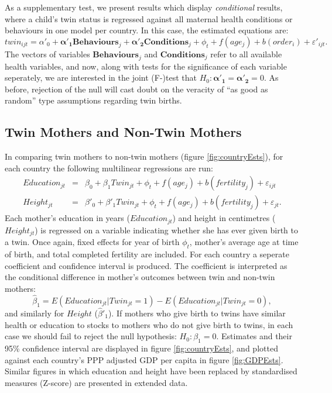 \documentclass{nature}
\begin{document}
\begin{linenumbers}



As a supplementary test, we present results which display \emph{conditional} results, where a child's twin status is regressed against all maternal health conditions or behaviours in one model per country.  In this case, the estimated equations are:
\begin{equation}
  \label{reg:twincond}
  twin_{ijt}=\alpha'_0 + \bm{\alpha'_1} \bm{Behaviours}_j + \bm{\alpha'_2} \bm{Conditions}_j + \phi_t + f(age_j) + b(order_i) + \varepsilon'_{ijt}.
\end{equation}
The vectors of variables $\bm{Behaviours}_j$ and $\bm{Conditions}_j$ refer to all available health variables, and now, along with tests for the significance of each variable seperately, we are interested in the joint (F-)test that $H_0:\bm{\alpha'_1}=\bm{\alpha'_2}=0$.  As before, rejection of the null will cast doubt on the veracity of ``as good as random'' type assumptions regarding twin births.

\subsection{Twin Mothers and Non-Twin Mothers}
In comparing twin mothers to non-twin mothers (figure \ref{fig:countryEsts}), for each country the following multilinear regressions are run:
\begin{eqnarray}
  Education_{jt}&=&\beta_0 + \beta_1 Twin_{jt} + \phi_t + f(age_j) + b(fertility_j) + \varepsilon_{ijt} \\
  Height_{jt}&=&\beta'_0 + \beta'_1 Twin_{jt} + \phi_t + f(age_j) + b(fertility_j) + \varepsilon_{jt}.
\end{eqnarray}
Each mother's education in years ($Education_{jt}$) and height in centimetres ($Height_{jt}$) is regressed on a variable indicating whether she has ever given birth to a twin.  Once again, fixed effects for year of birth $\phi_t$, mother's average age at time of birth, and total completed fertility are included.  For each country a seperate coefficient and confidence interval is produced.  The coefficient is interpreted as the conditional difference in mother's outcomes between twin and non-twin mothers:
\[
\hat\beta_1 = E(Education_{jt}| Twin_{jt}=1) - E(Education_{jt}| Twin_{jt}=0),
\]
and similarly for $Height$ ($\hat\beta'_1$).  If mothers who give birth to twins have similar health or education to stocks to mothers who do not give birth to twins, in each case we should fail to reject the null hypothesis: $H_0: \beta_1=0$.  Estimates and their 95\% confidence interval are displayed in figure \ref{fig:countryEsts}, and plotted against each country's PPP adjusted GDP per capita in figure \ref{fig:GDPEsts}.  Similar figures in which education and height have been replaced by standardised measures (Z-score) are presented in extended data.


\end{linenumbers}
\end{document}
